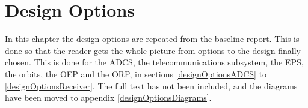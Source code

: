 \chapter{Design Options}
\label{designOptions}

In this chapter the design options are repeated from the baseline report. This is done so that the reader gets the whole picture from options to the design finally chosen. This is done for the \ac{ADCS}, the telecommunications subsystem, the \ac{EPS}, the orbits, the \ac{OEP} and the \ac{ORP}, in sections \ref{designOptionsADCS} to \ref{designOptionsReceiver}. The full text has not been included, and the diagrams have been moved to appendix \ref{designOptionsDiagrams}.
